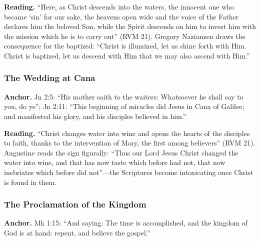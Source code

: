 \textbf{Reading.} ``Here, as Christ descends into the waters, the
innocent one who became `sin' for our sake, the heavens open wide and
the voice of the Father declares him the beloved Son, while the Spirit
descends on him to invest him with the mission which he is to carry
out'' (RVM 21). Gregory Nazianzen draws the consequence for the baptized:
``Christ is illumined, let us shine forth with Him. Christ is baptized,
let us descend with Him that we may also ascend with
Him.''

\subsubsection{The Wedding at Cana}

\textbf{Anchor.} Jn 2:5: ``His mother saith to the waiters: Whatsoever
he shall say to you, do ye''; Jn 2:11: ``This beginning of miracles did
Jesus in Cana of Galilee; and manifested his glory, and his disciples
believed in him.''

\textbf{Reading.} ``Christ changes water into wine and opens the hearts
of the disciples to faith, thanks to the intervention of Mary, the first
among believers'' (RVM 21). Augustine reads the sign figurally: ``Thus
our Lord Jesus Christ changed the water into wine, and that has now
taste which before had not, that now inebriates which before did
not''---the Scriptures become intoxicating once Christ is found in
them.

\subsubsection{The Proclamation of the Kingdom}

\textbf{Anchor.} Mk 1:15: ``And saying: The time is accomplished, and
the kingdom of God is at hand: repent, and believe the gospel.''

